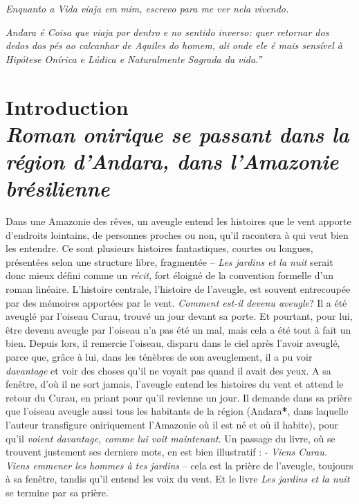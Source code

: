 \emph{Enquanto a Vida viaja em mim, escrevo para me ver nela vivendo.}

\emph{Andara é Coisa que viaja por dentro e no sentido inverso: quer
retornar dos dedos dos pés ao calcanhar de Aquiles do homem, ali onde
ele é mais sensível à Hipótese Onírica e Lúdica e Naturalmente Sagrada
da vida.''}

\chapter*{Introduction\\
\emph{Roman onirique se passant dans la région d'Andara, dans l'Amazonie brésilienne}}


Dans une Amazonie des rêves, un aveugle entend les histoires que le vent
apporte d'endroits lointains, de personnes proches ou non, qu'il
racontera à qui veut bien les entendre. Ce sont plusieurs histoires
fantastiques, courtes ou longues, présentées selon une structure libre,
fragmentée -- \emph{Les jardins et la nuit} serait donc mieux défini
comme un \emph{récit}, fort éloigné de la convention formelle d'un roman
linéaire. L'histoire centrale, l'histoire de l'aveugle, est souvent
entrecoupée par des mémoires apportées par le vent. \emph{Comment est-il
devenu aveugle}? Il a été aveuglé par l'oiseau Curau, trouvé un jour
devant sa porte. Et pourtant, pour lui, être devenu aveugle par l'oiseau
n'a pas été un mal, mais cela a été tout à fait un bien. Depuis lors, il
remercie l'oiseau, disparu dans le ciel après l'avoir aveuglé, parce
que, grâce à lui, dans les ténèbres de son aveuglement, il a pu voir
\emph{davantage} et voir des choses qu'il ne voyait pas quand il avait
des yeux. A sa fenêtre, d'où il ne sort jamais, l'aveugle entend les
histoires du vent et attend le retour du Curau, en priant pour qu'il
revienne un jour. Il demande dans sa prière que l'oiseau aveugle aussi
tous les habitants de la région (Andara\textbf{*}, dans laquelle l'auteur
transfigure oniriquement l'Amazonie où il est né et où il habite), pour
qu'il \emph{voient davantage, comme lui voit maintenant}. Un passage du
livre, où se trouvent justement ses derniers mots, en est bien
illustratif : - \emph{Viens Curau. Viens emmener les hommes à tes
jardins} -- cela est la prière de l'aveugle, toujours à sa fenêtre,
tandis qu'il entend les voix du vent. Et le livre \emph{Les jardins et
la nuit} se termine par sa prière.\\

